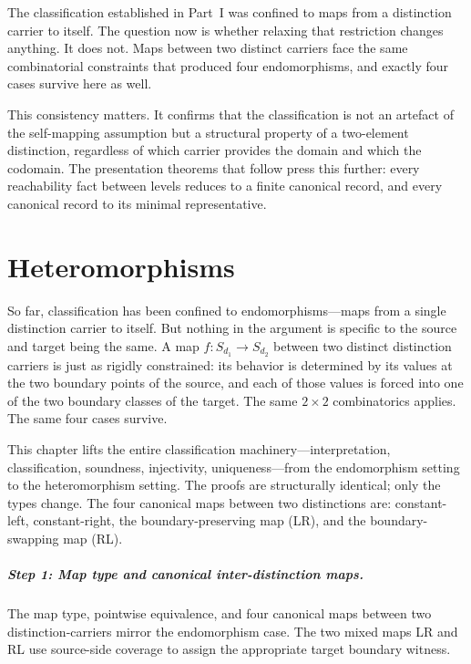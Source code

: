 \documentclass[11pt,a4paper]{book}
\def\texttt#1{#1}%
\begin{document}
The classification established in Part~I was confined to maps from a distinction carrier to itself. The question now is whether relaxing that restriction changes anything. It does not. Maps between two distinct carriers face the same combinatorial constraints that produced four endomorphisms, and exactly four cases survive here as well.

This consistency matters. It confirms that the classification is not an artefact of the self-mapping assumption but a structural property of a two-element distinction, regardless of which carrier provides the domain and which the codomain. The presentation theorems that follow press this further: every reachability fact between levels reduces to a finite canonical record, and every canonical record to its minimal representative.

\chapter{Heteromorphisms}

So far, classification has been confined to endomorphisms—maps from a single distinction carrier to itself. But nothing in the argument is specific to the source and target being the same. A map $f : S_{d_1} \to S_{d_2}$ between two distinct distinction carriers is just as rigidly constrained: its behavior is determined by its values at the two boundary points of the source, and each of those values is forced into one of the two boundary classes of the target. The same $2 \times 2$ combinatorics applies. The same four cases survive.

This chapter lifts the entire classification machinery—interpretation, classification, soundness, injectivity, uniqueness—from the endomorphism setting to the heteromorphism setting. The proofs are structurally identical; only the types change. The four canonical maps between two distinctions are: constant-left, constant-right, the boundary-preserving map (\texttt{LR}), and the boundary-swapping map (\texttt{RL}).

\paragraph{Step 1: Map type and canonical inter-distinction maps.}
The map type, pointwise equivalence, and four canonical maps between two distinction-carriers mirror the endomorphism case.
The two mixed maps \texttt{LR} and \texttt{RL} use source-side coverage to assign the appropriate target boundary witness.
\end{document}
